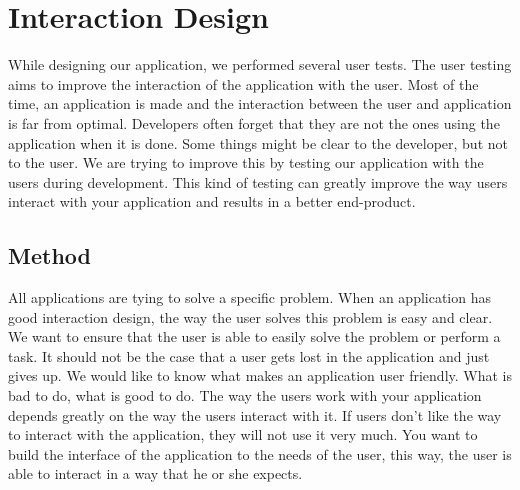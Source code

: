\section{Interaction Design}
While designing our application, we performed several user tests. The user testing aims to improve the interaction of the application with the user. Most of the time, an application is made and the interaction between the user and application is far from optimal. Developers often forget that they are not the ones using the application when it is done. Some things might be clear to the developer, but not to the user. We are trying to improve this by testing our application with the users during development. This kind of testing can greatly improve the way users interact with your application and results in a better end-product.
\subsection{Method}
All applications are tying to solve a specific problem. When an application has good interaction design, the way the user solves this problem is easy and clear. We want to ensure that the user is able to easily solve the problem or perform a task. It should not be the case that a user gets lost in the application and just gives up. We would like to know what makes an application user friendly. What is bad to do, what is good to do. The way the users work with your application depends greatly on the way the users interact with it. If users don't like the way to interact with the application, they will not use it very much. You want to build the interface of the application to the needs of the user, this way, the user is able to interact in a way that he or she expects.\\

